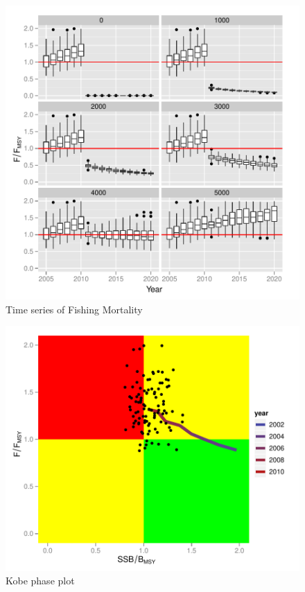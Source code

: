 \documentclass[a4paper, 11pt, oldtoc]{artikel1}
\begin{document}
\begin{figure}
\begin{center}
\includegraphics{kobe-004}
\caption{Time series of Fishing Mortality}
\end{center}
\end{figure}

\begin{figure}
\begin{center}
\includegraphics{kobe-005}
\caption{Kobe phase plot}
\end{center}
\end{figure}
\end{document}
